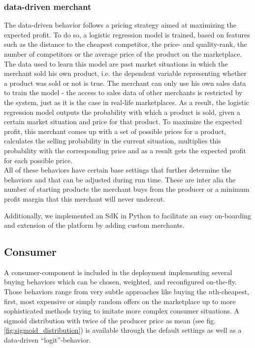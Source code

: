 \subsubsection{data-driven merchant}

The data-driven behavior follows a pricing strategy aimed at maximizing the expected profit. To do so, a logistic regression model is trained, based on features such as the distance to the cheapest competitor, the price- and quality-rank, the number of competitors or the average price of the product on the marketplace. The data used to learn this model are past market situations in which the merchant sold his own product, i.e. the dependent variable representing whether a product was sold or not is true. The merchant can only use his own sales data to train the model - the access to sales data of other merchants is restricted by the system, just as it is the case in real-life marketplaces. As a result, the logistic regression model outputs the probability with which a product is sold, given a certain market situation and price for that product. To maximize the expected profit, this merchant comes up with a set of possible prices for a product, calculates the selling probability in the current situation, multiplies this probability with the corresponding price and as a result gets the expected profit for each possible price. \\

All of these behaviors have certain base settings that further determine the behaviors and that can be adjusted during run time. These are inter alia the number of starting products the merchant buys from the producer or a minimum profit margin that this merchant will never undercut.

Additionally, we implemented an SdK in Python to facilitate an easy on-boarding and extension of the platform by adding custom merchants.

\subsection{Consumer}
\label{sec:Behaviors_Consumer}
%

A consumer-component is included in the deployment implementing several buying behaviors which can be chosen, weighted, and reconfigured on-the-fly. Those behaviors range from very subtle approaches like buying the $n$th-cheapest, first, most expensive or simply random offers on the marketplace up to more sophisticated methods trying to imitate more complex consumer situations. A sigmoid distribution with twice of the producer price as mean (see fig. \ref{fig:sigmoid_distribution}) is available through the default settings as well as a data-driven ``logit''-behavior.

